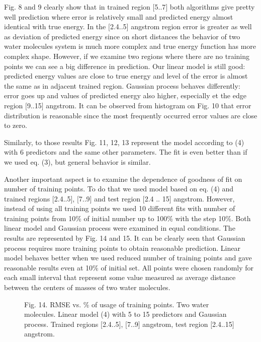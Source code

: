 \documentclass[aps,prl,reprint,amsmath,amssymb,nature]{revtex4-1}
\begin{document}
Fig. 8 and 9 clearly show that in trained region $[$5..7$]$ both 
algorithms give pretty well prediction where error is relatively small 
and predicted energy almost identical with true energy. In the 
$[$2.4..5$]$ angstrom region error is greater as well as deviation of 
predicted energy since on short distances the behavior of two water 
molecules system is much more complex and true energy function has more 
complex shape. However, if we examine two regions where there are no 
training points we can see a big difference in prediction. Our linear 
model is still good: predicted energy values are close to true energy 
and level of the error is almost the same as in adjacent trained region. 
Gaussian process behaves differently: error goes up and values of 
predicted energy also higher, especially et the edge region $[$9..15$]$ 
angstrom. It can be observed from histogram on Fig. 10 that error 
distribution is reasonable since the most frequently occurred error 
values are close to zero.


Similarly, to those results Fig. 11, 12, 13 represent the model 
according to (4) with 6 predictors and the same other parameters. The 
fit is even better than if we used eq. (3), but general behavior is 
similar.




Another important aspect is to examine the dependence of goodness of fit 
on number of training points. To do that we used model based on eq. (4) 
and trained regions $[$2.4..5$]$, $[$7..9$]$ and test region $[$2.4 .. 
15$]$ angstrom. However, instead of using all training points we used 10 
different fits with number of training points from 10\% of initial 
number up to 100\% with the step 10\%. Both linear model and Gaussian 
process were examined in equal conditions. The results are represented 
by Fig. 14 and 15. It can be clearly seen that Gaussian process requires 
more training points to obtain reasonable prediction. Linear model 
behaves better when we used reduced number of training points and gave 
reasonable results even at 10\% of initial set. All points were chosen 
randomly for each small interval that represent some value measured as 
average distance between the centers of masses of two water molecules. 

\begin{figure}[h]
\centering
\caption{Fig. 14. RMSE vs. \% of usage of training points. Two water 
molecules. Linear model (4) with 5 to 15 predictors and Gaussian 
process. Trained regions $[$2.4..5$]$, $[$7..9$]$ angstrom, test region 
$[$2.4..15$]$ angstrom.}
\end{figure}
\end{document}
